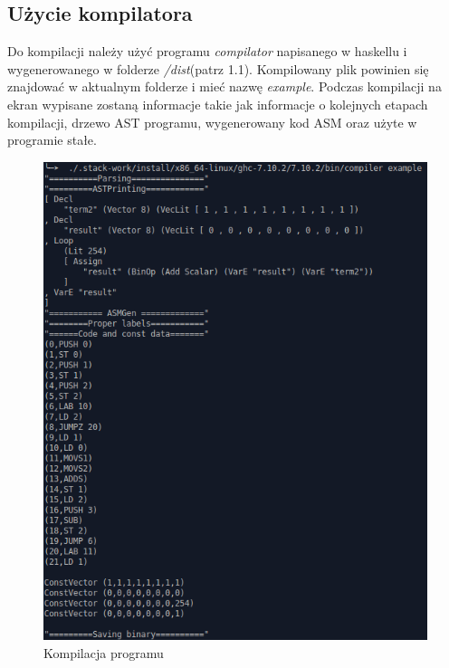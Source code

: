 \subsection{Użycie kompilatora}
Do kompilacji należy użyć programu \textit{compilator} napisanego w haskellu i wygenerowanego w folderze \textit{/dist}(patrz 1.1). Kompilowany plik powinien się znajdować w aktualnym folderze i mieć nazwę \textit{example}.
Podczas kompilacji na ekran wypisane zostaną informacje takie jak informacje o kolejnych etapach kompilacji, drzewo AST programu, wygenerowany kod ASM oraz użyte w programie stałe.
\begin{figure}[!h]
\centering
\includegraphics[scale=0.75]{images/kompilator}
\caption{Kompilacja programu}
\end{figure}
\clearpage
